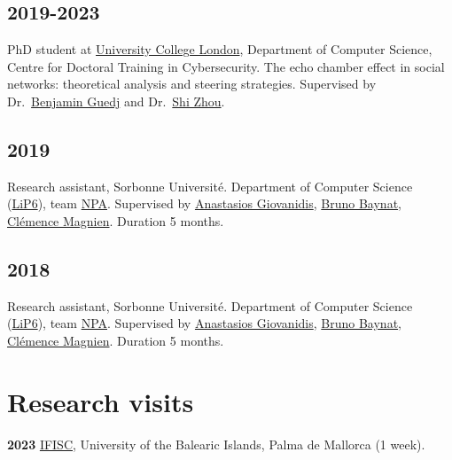 \documentclass[a4paper,12pt]{article}
\begin{document}
\subsection*{2019-2023} 
PhD student at \href{https://www.ucl.ac.uk/}{University College London}, Department of Computer Science, Centre for Doctoral Training in Cybersecurity. The echo chamber effect in social networks: theoretical analysis and steering strategies. Supervised by Dr.\ \href{https://bguedj.github.io/}{Benjamin Guedj} and Dr.\ \href{https://wp.cs.ucl.ac.uk/shizhou/}{Shi Zhou}. %


\subsection*{2019} 
Research assistant, Sorbonne Université. Department of Computer Science (\href{https://www.lip6.fr/}{LiP6}), team \href{https://www-npa.lip6.fr/}{NPA}. Supervised by \href{https://anastasiosgiovanidis.net/}{Anastasios Giovanidis}, \href{https://www.lip6.fr/actualite/personnes-fiche.php?ident=P144}{Bruno Baynat}, \href{https://www-complexnetworks.lip6.fr/~magnien/}{Clémence Magnien}. Duration 5 months.

\subsection*{2018} 
Research assistant, Sorbonne Université. Department of Computer Science (\href{https://www.lip6.fr/}{LiP6}), team \href{https://www-npa.lip6.fr/}{NPA}. Supervised by \href{https://anastasiosgiovanidis.net/}{Anastasios Giovanidis}, \href{https://www.lip6.fr/actualite/personnes-fiche.php?ident=P144}{Bruno Baynat}, \href{https://www-complexnetworks.lip6.fr/~magnien/}{Clémence Magnien}. Duration 5 months.





\section*{Research visits}
\textbf{2023} \href{https://ifisc.uib-csic.es/en/}{IFISC}, University of the Balearic Islands, Palma de Mallorca (1 week).
\end{document}

